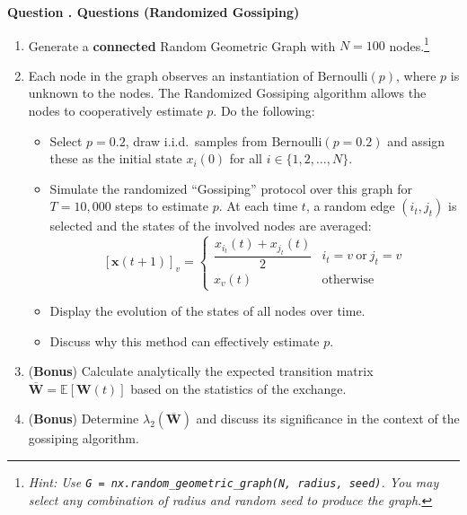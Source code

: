 \documentclass{article}
\newcounter{questioncounter}
\newcommand{\question}[1]{%
  \stepcounter{questioncounter}%
  \vspace{1em}%
  \noindent\textbf{\textcolor{deepblue}{\large Question \thequestioncounter.} #1}%
  \vspace{0.3em}%
}
\begin{document}
\vspace{1em}

\question{\textbf{Questions (Randomized Gossiping)}}

\begin{enumerate}[leftmargin=1.5em]
\item Generate a \textbf{connected} Random Geometric Graph with $N=100$ nodes.\footnote{\textit{Hint: Use \texttt{G = nx.random\_geometric\_graph(N, radius, seed)}. You may select any combination of radius and random seed to produce the graph.}}

\item Each node in the graph observes an instantiation of $\mathrm{Bernoulli}(p)$, where $p$ is unknown to the nodes. The Randomized Gossiping algorithm allows the nodes to cooperatively estimate $p$. Do the following:
\begin{itemize}[leftmargin=1.5em]
  \item Select $p=0.2$, draw i.i.d.\ samples from $\mathrm{Bernoulli}(p=0.2)$ and assign these as the initial state $x_i(0)$ for all $i \in \{1, 2, \ldots, N\}$.
  \item Simulate the randomized ``Gossiping'' protocol over this graph for $T = 10{,}000$ steps to estimate $p$. At each time $t$, a random edge $(i_t, j_t)$ is selected and the states of the involved nodes are averaged:
\[
[\bm{x}(t+1)]_v =
\begin{cases}
\dfrac{x_{i_t}(t)+x_{j_t}(t)}{2} & i_t=v\ \text{or}\ j_t=v\\[0.5em]
x_v(t) & \text{otherwise}
\end{cases}
\]
  \item Display the evolution of the states of all nodes over time.
  \item Discuss why this method can effectively estimate $p$.
\end{itemize}

\item (\textbf{Bonus}) Calculate analytically the expected transition matrix $\overline{\bm{W}} = \mathbb{E}[\bm{W}(t)]$ based on the statistics of the exchange.

\item (\textbf{Bonus}) Determine $\lambda_2(\overline{\bm{W}})$ and discuss its significance in the context of the gossiping algorithm.
\end{enumerate}

\newpage

\end{document}
